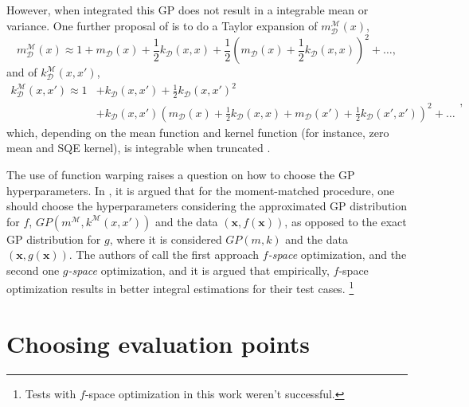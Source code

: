 However, when integrated this GP does not result in a integrable mean or variance. One further proposal of \cite{Chai_2019} is to do a Taylor expansion of $m^\mathcal{M}_\mathcal{D}(x)$, 
\begin{equation}\label{taylormomentmatched}
 m^\mathcal{M}_\mathcal{D}(x) \approx 1 + m_\mathcal{D}(x) + \frac{1}{2} k_\mathcal{D}(x,x) + \frac{1}{2}\left(m_\mathcal{D}(x) + \frac{1}{2} k_\mathcal{D}(x,x)\right)^2 + \ldots,
\end{equation}
and of $k^\mathcal{M}_\mathcal{D}(x,x')$,
\begin{equation}
\begin{split}
 k^\mathcal{M}_\mathcal{D}(x,x')  \approx 1 & + k_\mathcal{D}(x,x') + \frac{1}{2} k_\mathcal{D}(x,x')^2 \\ & +
 k_\mathcal{D}(x,x') \left(m_\mathcal{D}(x) + \frac{1}{2} k_\mathcal{D}(x,x) + m_\mathcal{D}(x') + \frac{1}{2} k_\mathcal{D}(x',x')\right)^2 + \ldots\end{split},
\end{equation}
which, depending on the mean function and kernel function (for instance, zero mean and SQE kernel), is integrable when truncated \cite{Chai_2019}.

The use of function warping raises a question on how to choose the GP hyperparameters. In \cite{Chai_2019}, it is argued that for the moment-matched procedure, one should choose the hyperparameters considering the approximated GP distribution for $f$,  $GP(m^\mathcal{M},k^\mathcal{M}(x,x'))$ and the data $(\mathbf{x},f(\mathbf{x}))$, as opposed to the exact GP distribution for $g$, where it is considered $GP(m,k)$ and the data $(\mathbf{x},g(\mathbf{x}))$. The authors of \cite{Chai_2019} call the first approach \textit{$f$-space} optimization, and the second one \textit{$g$-space} optimization, and it is argued that empirically, $f$-space optimization results in better integral estimations for their test cases. \footnote{Tests with $f$-space optimization in this work weren't successful.}

\section{Choosing evaluation points}

